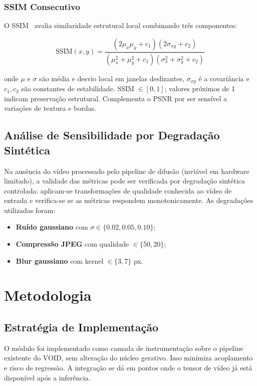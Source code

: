 \documentclass[conference]{IEEEtran}
\begin{document}
\subsubsection{SSIM Consecutivo}

O SSIM~\cite{ssim} avalia similaridade estrutural local combinando três componentes:

\begin{equation}
    \mathrm{SSIM}(x, y) = \frac{(2\mu_x\mu_y + c_1)(2\sigma_{xy} + c_2)}{(\mu_x^2 + \mu_y^2 + c_1)(\sigma_x^2 + \sigma_y^2 + c_2)}
\label{eq:ssim}
\end{equation}

onde $\mu$ e $\sigma$ são média e desvio local em janelas deslizantes, $\sigma_{xy}$ é a covariância e $c_1, c_2$ são constantes de estabilidade. SSIM $\in [0, 1]$; valores próximos de 1 indicam preservação estrutural. Complementa o PSNR por ser sensível a variações de textura e bordas.

\subsection{Análise de Sensibilidade por Degradação Sintética}

Na ausência do vídeo processado pelo pipeline de difusão (inviável em hardware limitado), a validade das métricas pode ser verificada por degradação sintética controlada: aplicam-se transformações de qualidade conhecida ao vídeo de entrada e verifica-se se as métricas respondem monotonicamente. As degradações utilizadas foram:
\begin{itemize}
    \item \textbf{Ruído gaussiano} com $\sigma \in \{0.02, 0.05, 0.10\}$;
    \item \textbf{Compressão JPEG} com qualidade $\in \{50, 20\}$;
    \item \textbf{Blur gaussiano} com kernel $\in \{3, 7\}$ px.
\end{itemize}

\section{Metodologia}

\subsection{Estratégia de Implementação}

O módulo foi implementado como camada de instrumentação sobre o pipeline existente do VOID, sem alteração do núcleo gerativo. Isso minimiza acoplamento e risco de regressão. A integração se dá em pontos onde o tensor de vídeo já está disponível após a inferência.
\end{document}
